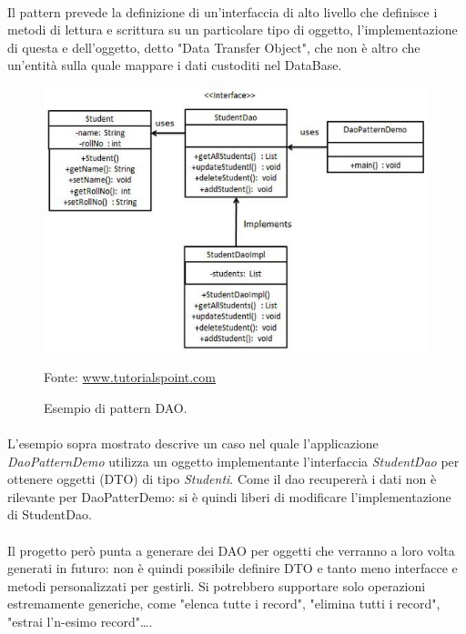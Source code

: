 \documentclass[a4paper, 12pt]{report}
\newcommand{\source}[1]{\caption*{Fonte: {#1}}}
\begin{document}
      \paragraph*{}
      Il pattern prevede la definizione di un'interfaccia di alto livello che definisce i metodi di lettura e scrittura su un particolare tipo di oggetto, l'implementazione di questa e dell'oggetto, detto "Data Transfer Object", che non è altro che un'entità sulla quale mappare i dati custoditi nel DataBase.
      \begin{figure}[H]
        \includegraphics[width=\textwidth]{dao_pattern_uml_diagram.jpg}
        \caption{Esempio di pattern DAO.}
        \source{\href{https://www.tutorialspoint.com/design_pattern/images/dao_pattern_uml_diagram.jpg}{www.tutorialspoint.com}}
      \end{figure}
      \paragraph*{}
      L'esempio sopra mostrato descrive un caso nel quale l'applicazione \emph{DaoPatternDemo} utilizza un oggetto implementante l'interfaccia \emph{StudentDao} per ottenere oggetti (DTO) di tipo \emph{Studenti}.
      Come il dao recupererà i dati non è rilevante per DaoPatterDemo: si è quindi liberi di modificare l'implementazione di StudentDao.
      \paragraph*{}
      Il progetto però punta a generare dei DAO per oggetti che verranno a loro volta generati in futuro: non è quindi possibile definire DTO e tanto meno interfacce e metodi personalizzati per gestirli.
      Si potrebbero supportare solo operazioni estremamente generiche, come "elenca tutte i record", "elimina tutti i record", "estrai l'n-esimo record"\dots.
\end{document}
